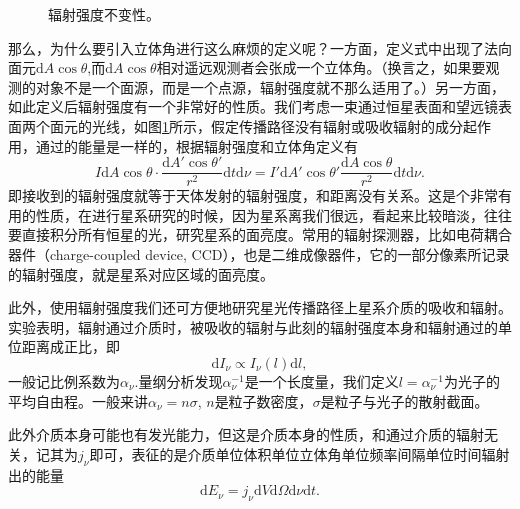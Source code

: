 \documentclass[../天体物理基础.tex]{subfiles}
\begin{document}
\begin{figure}[!htp]
\captionsetup{justification=raggedright, singlelinecheck=false}
\caption{辐射强度不变性。}
\label{辐射强度不变性。}
\end{figure}

那么，为什么要引入立体角进行这么麻烦的定义呢？一方面，定义式中出现了法向面元$\mathrm{d}A\cos\theta$,而$\mathrm{d}A\cos\theta$相对遥远观测者会张成一个立体角。（换言之，如果要观测的对象不是一个面源，而是一个点源，辐射强度就不那么适用了。）另一方面，如此定义后辐射强度有一个非常好的性质。我们考虑一束通过恒星表面和望远镜表面两个面元的光线，如图\ref{辐射强度不变性。}所示，假定传播路径没有辐射或吸收辐射的成分起作用，通过的能量是一样的，根据辐射强度和立体角定义有
\begin{equation}
I\mathrm{d}A\cos\theta\cdot\frac{\mathrm{d}A'\cos\theta'}{r^{2}}\mathrm{d}t\mathrm{d}\nu=I'\mathrm{d}A'\cos\theta'\frac{\mathrm{d}A\cos\theta}{r^{2}}\mathrm{d}t\mathrm{d}\nu.
\end{equation}
即接收到的辐射强度就等于天体发射的辐射强度，和距离没有关系。这是个非常有用的性质，在进行星系研究的时候，因为星系离我们很远，看起来比较暗淡，往往要直接积分所有恒星的光，研究星系的面亮度。常用的辐射探测器，比如电荷耦合器件（charge-coupled device, CCD），也是二维成像器件，它的一部分像素所记录的辐射强度，就是星系对应区域的面亮度。

此外，使用辐射强度我们还可方便地研究星光传播路径上星系介质的吸收和辐射。实验表明，辐射通过介质时，被吸收的辐射与此刻的辐射强度本身和辐射通过的单位距离成正比，即
\begin{equation}
\mathrm{d}I_{\nu}\propto{}I_{\nu}\left(l\right)\mathrm{d}l,
\end{equation}
一般记比例系数为$\alpha_{\nu}$.量纲分析发现$\alpha_{\nu}^{-1}$是一个长度量，我们定义$l=\alpha_{\nu}^{-1}$为光子的平均自由程。一般来讲$\alpha_{\nu}=n\sigma$, $n$是粒子数密度，$\sigma$是粒子与光子的散射截面。

此外介质本身可能也有发光能力，但这是介质本身的性质，和通过介质的辐射无关，记其为$j_{\nu}$即可，表征的是介质单位体积单位立体角单位频率间隔单位时间辐射出的能量
\begin{equation}
\mathrm{d}E_{\nu}=j_{\nu}\mathrm{d}V\mathrm{d}\Omega\mathrm{d}\nu\mathrm{d}t.
\end{equation}
\end{document}
